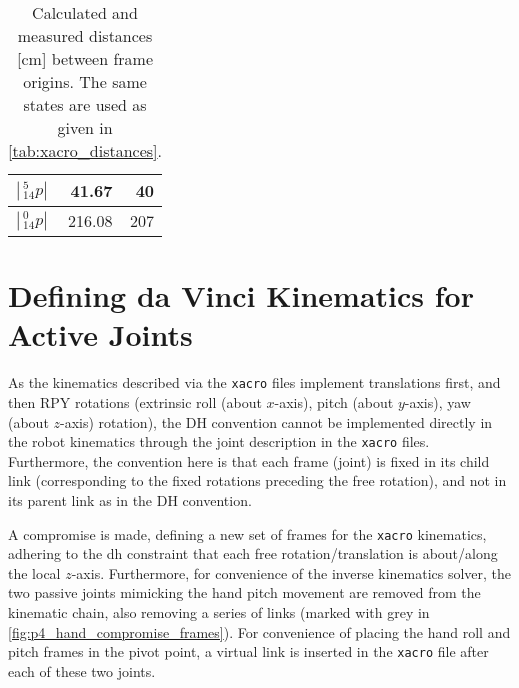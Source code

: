 \begin{table}[htbp]
{\begin{tabular}{l r r}
$|\,^5_{14} p|$ & 41.67 & 40\\\hline %
$|\,^0_{14} p|$ & 216.08 & 207
\end{tabular}
\label{tab:state7dh}%
}\hfill
\setlength{\tabcolsep}{6pt}
\caption{Calculated and measured distances [cm] between frame origins. The same states are used as given in \autoref{tab:xacro_distances}.}
\label{tab:DH_distances}
\end{table}



\section{Defining da Vinci Kinematics for Active Joints}\label{sec:app_activejoints_kinematics}
As the kinematics described via the \texttt{xacro} files implement translations first, and then RPY rotations (extrinsic roll (about $x$-axis), pitch (about $y$-axis), yaw (about $z$-axis) rotation), the DH convention cannot be implemented directly in the robot kinematics through the joint description in the \texttt{xacro} files. Furthermore, the convention here is that each frame (joint) is fixed in its child link (corresponding to the fixed rotations preceding the free rotation), and not in its parent link as in the DH convention.

A compromise is made, defining a new set of frames for the \texttt{xacro} kinematics, adhering to the \gls{dh} constraint that each free rotation/translation is about/along the local $z$-axis. Furthermore, for convenience of the inverse kinematics solver, the two passive joints mimicking the hand pitch movement are removed from the kinematic chain, also removing a series of links (marked with grey in \autoref{fig:p4_hand_compromise_frames}). For convenience of placing the hand roll and pitch frames in the pivot point, a virtual link is inserted in the \texttt{xacro} file after each of these two joints. 

